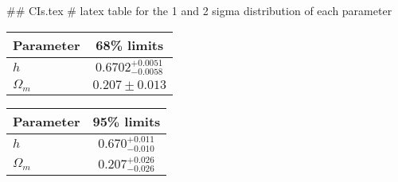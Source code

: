 ## CIs.tex
# latex table for the 1 and 2 sigma distribution of each parameter

\begin{tabular} { l  c}
 Parameter &  68\% limits\\
\hline
{\boldmath$h              $} & $0.6702^{+0.0051}_{-0.0058}$\\
{\boldmath$\Omega_m       $} & $0.207\pm 0.013            $\\
\hline
\end{tabular}

\begin{tabular} { l  c}
 Parameter &  95\% limits\\
\hline
{\boldmath$h              $} & $0.670^{+0.011}_{-0.010}   $\\
{\boldmath$\Omega_m       $} & $0.207^{+0.026}_{-0.026}   $\\
\hline
\end{tabular}
